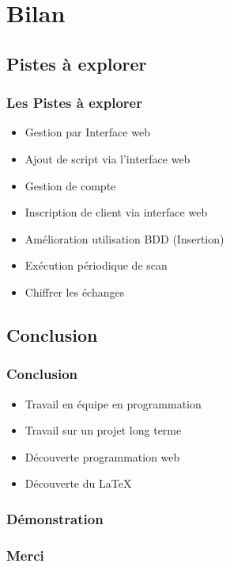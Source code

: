 \section{Bilan}
	\subsection{Pistes à explorer}
		\frametitle{\textbf{Les Pistes à explorer}}
		\begin{frame}
			\begin{itemize}
				\item Gestion par Interface web
				\item Ajout de script via l'interface web
				\item Gestion de compte
				\item Inscription de client via interface web
				\item Amélioration utilisation BDD (Insertion)
				\item Exécution périodique de scan
				\item Chiffrer les échanges
			\end{itemize}
		\end{frame}

	\subsection{Conclusion}
		\begin{frame}
			\frametitle{\textbf{Conclusion}}
			\begin{itemize}
				\item Travail en équipe en programmation
				\item Travail sur un projet long terme
				\item Découverte programmation web
				\item Découverte du LaTeX
		\end{itemize}
		\end{frame}
		
		\begin{frame}
			\frametitle{\textbf{Démonstration}}
		\end{frame}

		\begin{frame}
			\frametitle{\textbf{Merci}}
		\end{frame}